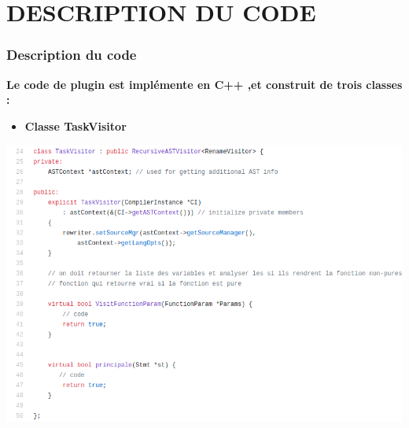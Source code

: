 \documentclass[hyperref={bookmarks=false},aspectratio=169]{beamer}
\begin{document}
\section{DESCRIPTION DU CODE}


\begin{frame}
\frametitle{Description du code}
\textbf{Le code de plugin est implémente en C++ ,et construit de trois classes :}
\begin{itemize}
  \item \textbf{Classe TaskVisitor}
\end{itemize}

\vfill
\begin{center} \includegraphics[scale=0.3]{./figures/class1.png} \\[2cm] \end{center}
\vfill



\end{frame}

\end{document}
